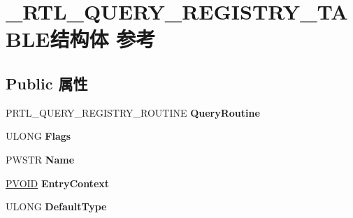 \hypertarget{struct___r_t_l___q_u_e_r_y___r_e_g_i_s_t_r_y___t_a_b_l_e}{}\section{\+\_\+\+R\+T\+L\+\_\+\+Q\+U\+E\+R\+Y\+\_\+\+R\+E\+G\+I\+S\+T\+R\+Y\+\_\+\+T\+A\+B\+L\+E结构体 参考}
\label{struct___r_t_l___q_u_e_r_y___r_e_g_i_s_t_r_y___t_a_b_l_e}
\subsection*{Public 属性}
\begin{DoxyCompactItemize}
\item 
\mbox{\label{struct___r_t_l___q_u_e_r_y___r_e_g_i_s_t_r_y___t_a_b_l_e_a99f383313f6673176fe11ff6cf154043}} 
P\+R\+T\+L\+\_\+\+Q\+U\+E\+R\+Y\+\_\+\+R\+E\+G\+I\+S\+T\+R\+Y\+\_\+\+R\+O\+U\+T\+I\+NE {\bfseries Query\+Routine}
\item 
\mbox{\label{struct___r_t_l___q_u_e_r_y___r_e_g_i_s_t_r_y___t_a_b_l_e_a7300ff2835155bd276fa8b24d246539c}} 
U\+L\+O\+NG {\bfseries Flags}
\item 
\mbox{\label{struct___r_t_l___q_u_e_r_y___r_e_g_i_s_t_r_y___t_a_b_l_e_a02bb1408f29dbed00cb59d2a5730b696}} 
P\+W\+S\+TR {\bfseries Name}
\item 
\mbox{\label{struct___r_t_l___q_u_e_r_y___r_e_g_i_s_t_r_y___t_a_b_l_e_a8814fdfb9d1b14abbc619167b0bad4a5}} 
\hyperlink{interfacevoid}{P\+V\+O\+ID} {\bfseries Entry\+Context}
\item 
\mbox{\label{struct___r_t_l___q_u_e_r_y___r_e_g_i_s_t_r_y___t_a_b_l_e_a971e2a7d3023e44e164f2e27e5c4a298}} 
U\+L\+O\+NG {\bfseries Default\+Type}
\item 
\mbox{\label{struct___r_t_l___q_u_e_r_y___r_e_g_i_s_t_r_y___t_a_b_l_e_a18902114a1d3d8e0f0600b64dd5b09b5}} 

\end{DoxyCompactItemize}
